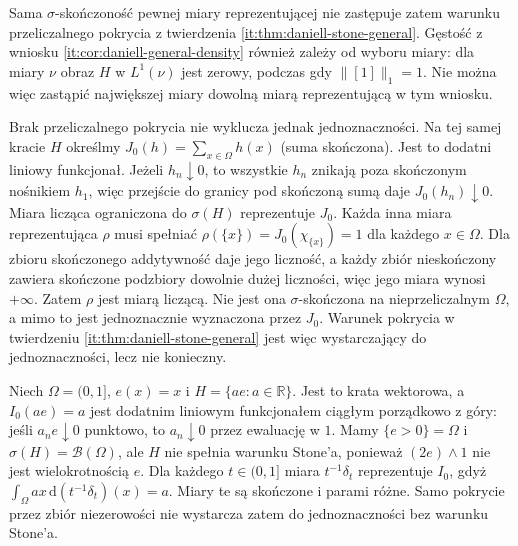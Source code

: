 \begin{przyklad}
Sama $\sigma$-skończoność pewnej miary reprezentującej
nie zastępuje zatem warunku przeliczalnego pokrycia
z twierdzenia \ref{it:thm:daniell-stone-general}.
Gęstość z wniosku \ref{it:cor:daniell-general-density}
również zależy od wyboru miary: dla miary $\nu$
obraz $H$ w $L^1(\nu)$ jest zerowy, podczas gdy
$\|[1]\|_1=1$. Nie można więc zastąpić największej
miary dowolną miarą reprezentującą w tym wniosku.

Brak przeliczalnego pokrycia nie wyklucza jednak
jednoznaczności. Na tej samej kracie $H$ określmy
$J_0(h)=\sum_{x\in\Omega}h(x)$ (suma skończona).
Jest to dodatni liniowy funkcjonał. Jeżeli
$h_n\downarrow0$, to wszystkie $h_n$ znikają poza
skończonym nośnikiem $h_1$, więc przejście do granicy
pod skończoną sumą daje $J_0(h_n)\downarrow0$.
Miara licząca ograniczona do $\sigma(H)$ reprezentuje
$J_0$. Każda inna miara reprezentująca $\rho$ musi
spełniać $\rho(\{x\})=J_0(\chi_{\{x\}})=1$
dla każdego $x\in\Omega$. Dla zbioru skończonego
addytywność daje jego liczność, a każdy zbiór
nieskończony zawiera skończone podzbiory dowolnie
dużej liczności, więc jego miara wynosi $+\infty$.
Zatem $\rho$ jest miarą liczącą. Nie jest ona
$\sigma$-skończona na nieprzeliczalnym $\Omega$,
a mimo to jest jednoznacznie wyznaczona przez $J_0$.
Warunek pokrycia w twierdzeniu
\ref{it:thm:daniell-stone-general} jest więc
wystarczający do jednoznaczności, lecz nie konieczny.
\end{przyklad}

\begin{przyklad}
\label{it:ex:daniell-without-stone}
Niech $\Omega=(0,1]$, $e(x)=x$ i
$H=\{ae:a\in\mathbb{R}\}$. Jest to krata wektorowa,
a $I_0(ae)=a$ jest dodatnim liniowym funkcjonałem
ciągłym porządkowo z góry: jeśli $a_ne\downarrow0$
punktowo, to $a_n\downarrow0$ przez ewaluację w $1$.
Mamy $\{e>0\}=\Omega$ i $\sigma(H)=\mathcal B(\Omega)$,
ale $H$ nie spełnia warunku Stone'a, ponieważ
$(2e)\wedge1$ nie jest wielokrotnością $e$.
Dla każdego $t\in(0,1]$ miara $t^{-1}\delta_t$
reprezentuje $I_0$, gdyż
$\int_\Omega ax\,\mathrm d(t^{-1}\delta_t)(x)=a$.
Miary te są skończone i parami różne. Samo pokrycie
przez zbiór niezerowości nie wystarcza zatem do
jednoznaczności bez warunku Stone'a.
\end{przyklad}

